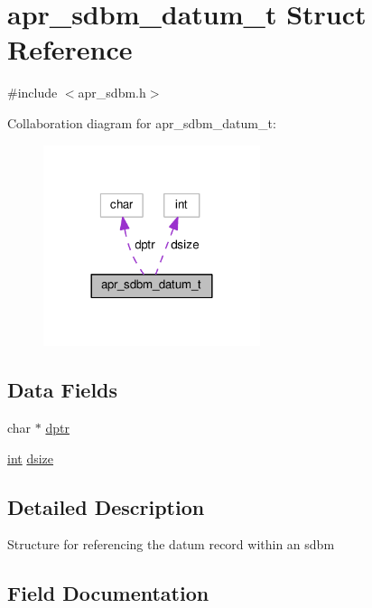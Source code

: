 \hypertarget{structapr__sdbm__datum__t}{}\section{apr\+\_\+sdbm\+\_\+datum\+\_\+t Struct Reference}
\label{structapr__sdbm__datum__t}


{\ttfamily \#include $<$apr\+\_\+sdbm.\+h$>$}



Collaboration diagram for apr\+\_\+sdbm\+\_\+datum\+\_\+t\+:
\nopagebreak
\begin{figure}[H]
\begin{center}
\leavevmode
\includegraphics[width=180pt]{structapr__sdbm__datum__t__coll__graph}
\end{center}
\end{figure}
\subsection*{Data Fields}
\begin{DoxyCompactItemize}
\item 
char $\ast$ \hyperlink{structapr__sdbm__datum__t_a927c668d3912a4cc8466b0f551d00169}{dptr}
\item 
\hyperlink{pcre_8txt_a42dfa4ff673c82d8efe7144098fbc198}{int} \hyperlink{structapr__sdbm__datum__t_aedbd0295ba540695d5b407f1dec90eb5}{dsize}
\end{DoxyCompactItemize}


\subsection{Detailed Description}
Structure for referencing the datum record within an sdbm 

\subsection{Field Documentation}
